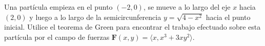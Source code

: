 \item Una partícula empieza en el punto $(-2, 0)$, se mueve a lo largo del eje $x$ hacia $(2, 0)$ y luego a lo largo de la semicircunferencia $y = \sqrt{4 - x^2}$ hacia el punto inicial. Utilice el teorema de Green para encontrar el trabajo efectuado sobre esta partícula por el campo de fuerzas $\mathbf{F}(x, y) = \langle x, x^3 + 3xy^2 \rangle$.
